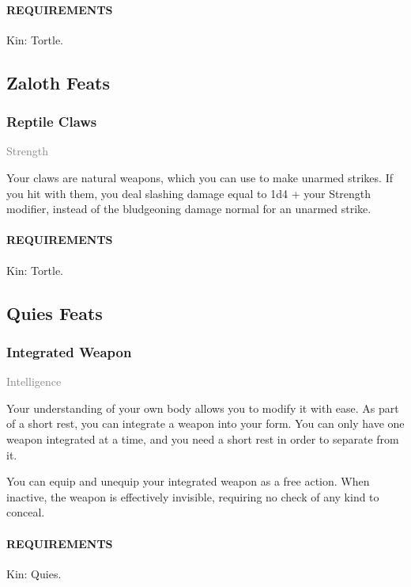     \paragraph{REQUIREMENTS} Kin: Tortle.

\subsection*{Zaloth Feats}
    \subsubsection{Reptile Claws} \label{feat::reptileclaws}
    \small{\textcolor{gray}{Strength}}

    \normalsize
    Your claws are natural weapons, which you can use to make unarmed strikes.
    If you hit with them, you deal slashing damage equal to 1d4 + your Strength modifier, instead of the bludgeoning damage normal for an unarmed strike.
    \paragraph{REQUIREMENTS} Kin: Tortle.

\subsection*{Quies Feats}
    \subsubsection{Integrated Weapon} \label{feat::integratedweapon}
    \small{\textcolor{gray}{Intelligence}}

    \normalsize
    Your understanding of your own body allows you to modify it with ease.
    As part of a short rest, you can integrate a weapon into your form.
    You can only have one weapon integrated at a time, and you need a short rest in order to separate from it.

    You can equip and unequip your integrated weapon as a free action.
    When inactive, the weapon is effectively invisible, requiring no check of any kind to conceal.
    \paragraph{REQUIREMENTS} Kin: Quies.

